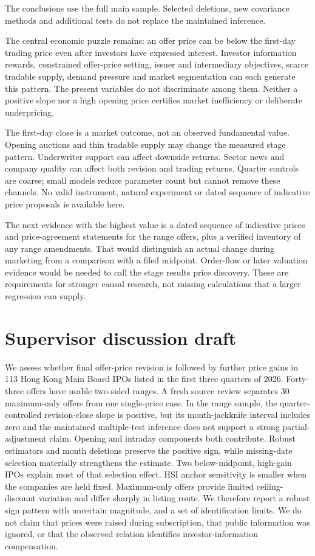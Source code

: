 \documentclass[10pt,a4paper]{article}
\begin{document}
{\footnotesize The conclusions use the full main sample. Selected deletions, new covariance methods and additional tests do not replace the maintained inference.}\par

The central economic puzzle remains: an offer price can be below the first-day trading price even after investors have expressed interest. Investor information rewards, constrained offer-price setting, issuer and intermediary objectives, scarce tradable supply, demand pressure and market segmentation can each generate this pattern. The present variables do not discriminate among them. Neither a positive slope nor a high opening price certifies market inefficiency or deliberate underpricing.

The first-day close is a market outcome, not an observed fundamental value. Opening auctions and thin tradable supply may change the measured stage pattern. Underwriter support can affect downside returns. Sector news and company quality can affect both revision and trading returns. Quarter controls are coarse; small models reduce parameter count but cannot remove these channels. No valid instrument, natural experiment or dated sequence of indicative price proposals is available here.

The next evidence with the highest value is a dated sequence of indicative prices and price-agreement statements for the range offers, plus a verified inventory of any range amendments. That would distinguish an actual change during marketing from a comparison with a filed midpoint. Order-flow or later valuation evidence would be needed to call the stage results price discovery. These are requirements for stronger causal research, not missing calculations that a larger regression can supply.

\section*{Supervisor discussion draft}

We assess whether final offer-price revision is followed by further price gains in 113 Hong Kong Main Board IPOs listed in the first three quarters of 2026. Forty-three offers have usable two-sided ranges. A fresh source review separates 30 maximum-only offers from one single-price case. In the range sample, the quarter-controlled revision-close slope is positive, but its month-jackknife interval includes zero and the maintained multiple-test inference does not support a strong partial-adjustment claim. Opening and intraday components both contribute. Robust estimators and month deletions preserve the positive sign, while missing-date selection materially strengthens the estimate. Two below-midpoint, high-gain IPOs explain most of that selection effect. HSI anchor sensitivity is smaller when the companies are held fixed. Maximum-only offers provide limited ceiling-discount variation and differ sharply in listing route. We therefore report a robust sign pattern with uncertain magnitude, and a set of identification limits. We do not claim that prices were raised during subscription, that public information was ignored, or that the observed relation identifies investor-information compensation.
\end{document}

